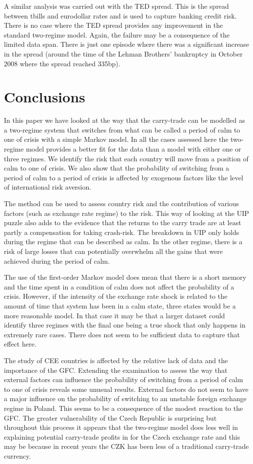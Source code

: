 \documentclass[12pt, a4paper, oneside]{article}\usepackage[]{graphicx}\usepackage[]{color}
\begin{document}
A similar analysis was carried out with the TED spread. This is the spread between tbills and eurodollar rates and is used to capture banking credit risk.  There is no case where the TED spread provides any improvement in the standard two-regime model.  Again, the failure may be a consequence of the limited data span. There is just one episode where there was a significant increase in the spread (around the time of the Lehman Brothers' bankruptcy in October 2008 where the spread reached 335bp).

\section{Conclusions}\label{secred:con}
In this paper we have looked at the way that the carry-trade can be modelled as a two-regime system that switches from what can be called a period of calm to one of crisis with a simple Markov model.  In all the cases assessed here the two-regime model provides a better fit for the data than a model with either one or three regimes. We identify the risk that each country will move from a position of calm to one of crisis. We also show that the probability of switching from a period of calm to a period of crisis is affected by exogenous factors like the level of international risk aversion.  

The method can be used to assess country risk and the contribution of various factors (such as exchange rate regime) to the risk.  This way of looking at the UIP puzzle also adds to the evidence that the returns to the carry trade are at least partly a compensation for taking crash-risk.  The breakdown in UIP only holds during the regime that can be described as calm.  In the other regime, there is a risk of large losses that can potentially overwhelm all the gains that were achieved during the period of calm. 

The use of the first-order Markov model does mean that there is a short memory and the time spent in a condition of calm does not affect the probability of a crisis.  However, if the intensity of the exchange rate shock is related to the amount of time that system has been in a calm state,  three states would be a more reasonable model. In that case it may be that a larger dataset could identify three regimes with the final one being a true shock that only happens in extremely rare cases.  There does not seem to be sufficient data to capture that effect here.  

The study of CEE countries is affected by the relative lack of data and the importance of the GFC.  Extending the examination to assess the way that external factors can influence the probability of switching from a period of calm to one of crisis reveals some unusual results.  External factors do not seem to have a major influence on the probability of switching to an unstable foreign exchange regime in Poland.    This seems to be a consequence of the modest reaction to the  GFC.  The greater vulnerability of the Czech Republic is surprising but throughout this process it appears that the two-regime model does less well in explaining potential carry-trade profits in for the Czech exchange rate and this may be because in recent years the CZK has been less of a traditional carry-trade currency. 


\end{document}
